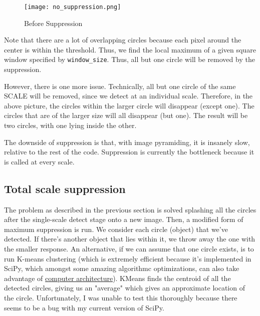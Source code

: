 \documentclass[11pt]{article}
\begin{document}
\begin{figure}[h]
\caption{Before Suppression}
\texttt{[image: no\_suppression.png]}
\end{figure}

Note that there are a lot of overlapping circles because each pixel around the center is within the threshold.  Thus, we find the local maximum of a given square window specified by \texttt{window\_size}.  Thus, all but one circle will be removed by the suppression.

However, there is one more issue.  Technically, all but one circle of the same SCALE will be removed, since we detect at an individual scale.  Therefore, in the above picture, the circles within the larger circle will disappear (except one).  The circles that are of the larger size will all disappear (but one).  The result will be two circles, with one lying inside the other.

The downside of suppression is that, with image pyramiding, it is insanely slow, relative to the rest of the code.  Suppression is currently the bottleneck because it is called at every scale.

\subsection{Total scale suppression}
The problem as described in the previous section is solved splashing all the circles after the single-scale detect stage onto a new image.  Then, a  modified form of maximum suppression is run.  We consider each circle (object) that we've detected. If there's another object that lies within it, we throw away the one with the smaller response.  An alternative, if we can assume that one circle exists, is to run K-means clustering (which is extremely efficient because it's implemented in SciPy, which amongst some amazing algorithmc optimizations, can also take advantage of \href{https://software.intel.com/en-us/articles/intel-mkl-and-third-party-applications-how-to-use-them-together}{computer architecture}).  KMeans finds the centroid of all the detected circles, giving us an "average" which gives an approximate location of the circle.  Unfortunately, I was unable to test this thoroughly because there seems to be a bug with my current version of SciPy.
\end{document}
